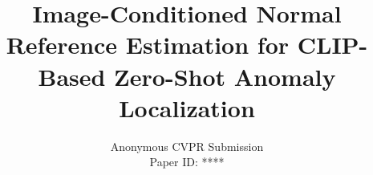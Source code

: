 \documentclass[10pt,twocolumn,letterpaper]{article}
\title{Image-Conditioned Normal Reference Estimation for CLIP-Based Zero-Shot Anomaly Localization}
\author{
  Anonymous CVPR Submission\\
  Paper ID: ****
}
\begin{document}
\maketitle

\newcommand{\method}{Ours (unnamed)}











{\small


}
\end{document}

